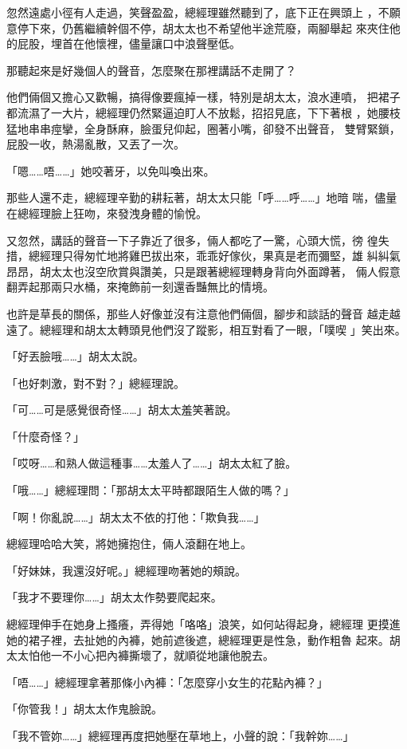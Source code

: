 忽然遠處小徑有人走過，笑聲盈盈，總經理雖然聽到了，底下正在興頭上
，不願意停下來，仍舊繼續幹個不停，胡太太也不希望他半途荒廢，兩腳舉起
來夾住他的屁股，埋首在他懷裡，儘量讓口中浪聲壓低。

那聽起來是好幾個人的聲音，怎麼聚在那裡講話不走開了？

他們倆個又擔心又歡暢，搞得像要瘋掉一樣，特別是胡太太，浪水連噴，
把裙子都流濕了一大片，總經理仍然緊逼迫盯人不放鬆，招招見底，下下著根
，她腰枝猛地串串痙攣，全身酥麻，臉蛋兒仰起，圈著小嘴，卻發不出聲音，
雙臂緊鎖，屁股一收，熱湯亂散，又丟了一次。

「嗯……唔……」她咬著牙，以免叫喚出來。

那些人還不走，總經理辛勤的耕耘著，胡太太只能「呼……呼……」地暗
喘，儘量在總經理臉上狂吻，來發洩身體的愉悅。

又忽然，講話的聲音一下子靠近了很多，倆人都吃了一驚，心頭大慌，徬
徨失措，總經理只得匆忙地將雞巴拔出來，乖乖好傢伙，果真是老而彌堅，雄
糾糾氣昂昂，胡太太也沒空欣賞與讚美，只是跟著總經理轉身背向外面蹲著，
倆人假意翻弄起那兩只水桶，來掩飾前一刻還香豔無比的情境。

也許是草長的關係，那些人好像並沒有注意他們倆個，腳步和談話的聲音
越走越遠了。總經理和胡太太轉頭見他們沒了蹤影，相互對看了一眼，「噗喫
」笑出來。

「好丟臉哦……」胡太太說。

「也好刺激，對不對？」總經理說。

「可……可是感覺很奇怪……」胡太太羞笑著說。

「什麼奇怪？」

「哎呀……和熟人做這種事……太羞人了……」胡太太紅了臉。

「哦……」總經理問：「那胡太太平時都跟陌生人做的嗎？」

「啊！你亂說……」胡太太不依的打他：「欺負我……」

總經理哈哈大笑，將她擁抱住，倆人滾翻在地上。

「好妹妹，我還沒好呢。」總經理吻著她的頰說。

「我才不要理你……」胡太太作勢要爬起來。

總經理伸手在她身上搔癢，弄得她「咯咯」浪笑，如何站得起身，總經理
更摸進她的裙子裡，去扯她的內褲，她前遮後遮，總經理更是性急，動作粗魯
起來。胡太太怕他一不小心把內褲撕壞了，就順從地讓他脫去。

「唔……」總經理拿著那條小內褲：「怎麼穿小女生的花點內褲？」

「你管我！」胡太太作鬼臉說。

「我不管妳……」總經理再度把她壓在草地上，小聲的說：「我幹妳……」

